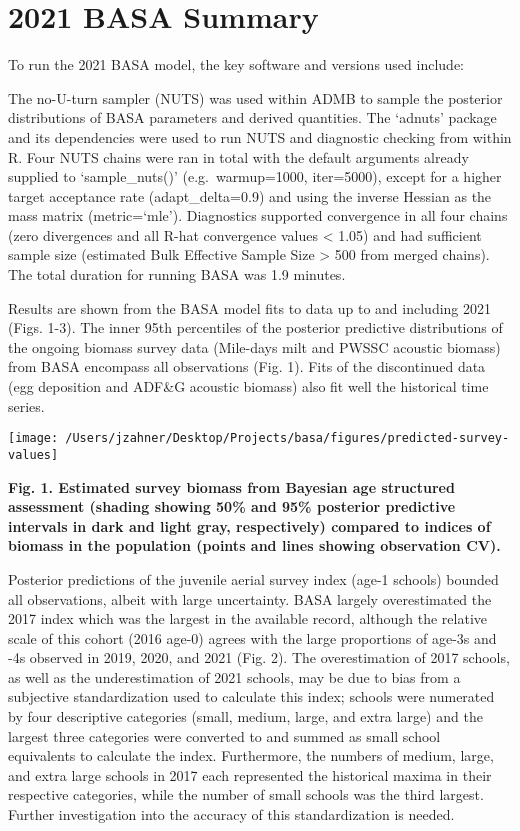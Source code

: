 \documentclass[
  11pt,
]{article}
\begin{document}
\hypertarget{basa-summary}{%
\section{2021 BASA Summary}\label{basa-summary}}

To run the 2021 BASA model, the key software and versions used include:

The no-U-turn sampler (NUTS) was used within ADMB to sample the
posterior distributions of BASA parameters and derived quantities. The
`adnuts' package and its dependencies were used to run NUTS and
diagnostic checking from within R. Four NUTS chains were ran in total
with the default arguments already supplied to `sample\_nuts()'
(e.g.~warmup=1000, iter=5000), except for a higher target acceptance
rate (adapt\_delta=0.9) and using the inverse Hessian as the mass matrix
(metric=`mle'). Diagnostics supported convergence in all four chains
(zero divergences and all R-hat convergence values \textless{} 1.05) and
had sufficient sample size (estimated Bulk Effective Sample Size
\textgreater{} 500 from merged chains). The total duration for running
BASA was 1.9 minutes.

Results are shown from the BASA model fits to data up to and including
2021 (Figs. 1-3). The inner 95th percentiles of the posterior predictive
distributions of the ongoing biomass survey data (Mile-days milt and
PWSSC acoustic biomass) from BASA encompass all observations (Fig. 1).
Fits of the discontinued data (egg deposition and ADF\&G acoustic
biomass) also fit well the historical time series.

\begin{center}\texttt{[image: /Users/jzahner/Desktop/Projects/basa/figures/predicted-survey-values]} \end{center}

\textbf{Fig. 1. Estimated survey biomass from Bayesian age structured
assessment (shading showing 50\% and 95\% posterior predictive intervals
in dark and light gray, respectively) compared to indices of biomass in
the population (points and lines showing observation CV).}

Posterior predictions of the juvenile aerial survey index (age-1
schools) bounded all observations, albeit with large uncertainty. BASA
largely overestimated the 2017 index which was the largest in the
available record, although the relative scale of this cohort (2016
age-0) agrees with the large proportions of age-3s and -4s observed in
2019, 2020, and 2021 (Fig. 2). The overestimation of 2017 schools, as
well as the underestimation of 2021 schools, may be due to bias from a
subjective standardization used to calculate this index; schools were
numerated by four descriptive categories (small, medium, large, and
extra large) and the largest three categories were converted to and
summed as small school equivalents to calculate the index. Furthermore,
the numbers of medium, large, and extra large schools in 2017 each
represented the historical maxima in their respective categories, while
the number of small schools was the third largest. Further investigation
into the accuracy of this standardization is needed.
\end{document}
